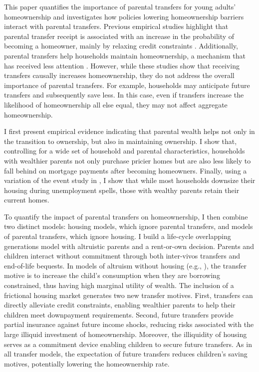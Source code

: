 \documentclass[12pt]{article}
\begin{document}
This paper quantifies the importance of parental transfers for young adults' homeownership and investigates how policies lowering homeownership barriers interact with parental transfers. Previous empirical studies highlight that parental transfer receipt is associated with an increase in the probability of becoming a homeowner, mainly by relaxing credit constraints \citep[see e.g.,][]{Lee2018,Blickle2019,wold2024housing}. Additionally, parental transfers help households maintain homeownership, a mechanism that has received less attention \citep[see e.g.,][]{bond2021role}. However, while these studies show that receiving transfers causally increases homeownership, they do not address the overall importance of parental transfers. For example, households may anticipate future transfers and subsequently save less. In this case, even if transfers increase the likelihood of homeownership all else equal, they may not affect aggregate homeownership.

I first present empirical evidence indicating that parental wealth helps not only in the transition to ownership, but also in maintaining ownership. I show that, controlling for a wide set of household and parental characteristics, households with wealthier parents not only purchase pricier homes but are also less likely to fall behind on mortgage payments after becoming homeowners. Finally, using a variation of the event study in \cite{Chetty2007}, I show that while most households downsize their housing during unemployment spells, those with wealthy parents retain their current homes.

To quantify the impact of parental transfers on homeownership, I then combine two distinct models: housing models, which ignore parental transfers, and models of parental transfers, which ignore housing. I build a life-cycle overlapping generations model with altruistic parents and a rent-or-own decision. Parents and children interact without commitment through both inter-vivos transfers and end-of-life bequests. In models of altruism without housing (e.g., \citealp{Altonji1997a,Barczyk2014}), the transfer motive is to increase the child's consumption when they are borrowing constrained, thus having high marginal utility of wealth. The inclusion of a frictional housing market generates two new transfer motives. First, transfers can directly alleviate credit constraints, enabling wealthier parents to help their children meet downpayment requirements. Second, future transfers provide partial insurance against future income shocks, reducing risks associated with the large illiquid investment of homeownership. Moreover, the illiquidity of housing serves as a commitment device enabling children to secure future transfers. As in all transfer models, the expectation of future transfers reduces children’s saving motives, potentially lowering the homeownership rate.
\end{document}
